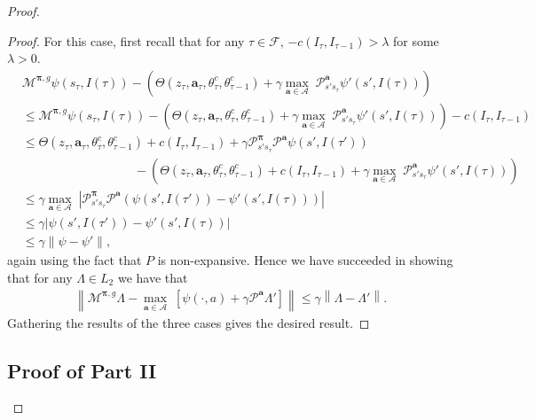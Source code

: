 \documentclass{article}
\begin{document}
\begin{proof}
\begin{proof}
For this case, first recall that for any $\tau\in\mathcal{F}$, $-c(I_\tau,I_{\tau-1})>\lambda$ for some $\lambda >0$.
% 
\begin{align*}
&\mathcal{M}^{\boldsymbol{\pi},g}\psi(s_{\tau},I(\tau))-\left(\Theta(z_\tau,\boldsymbol{a}_\tau,\theta^c_{\tau},\theta^c_{\tau-1})+\gamma\underset{\boldsymbol{a}\in\boldsymbol{\mathcal{A}}}{\max}\;\mathcal{P}^{\boldsymbol{a}}_{s's_\tau}\psi'(s',I(\tau))\right)
\\&\leq \mathcal{M}^{\boldsymbol{\pi},g}\psi(s_{\tau},I(\tau))-\left(\Theta(z_\tau,\boldsymbol{a}_\tau,\theta^c_{\tau},\theta^c_{\tau-1})+\gamma\underset{\boldsymbol{a}\in\boldsymbol{\mathcal{A}}}{\max}\;\mathcal{P}^{\boldsymbol{a}}_{s's_\tau}\psi'(s',I(\tau))\right)-c(I_\tau,I_{\tau-1})
\\&\leq \Theta(z_\tau,\boldsymbol{a}_\tau,\theta^c_{\tau},\theta^c_{\tau-1})+c(I_\tau,I_{\tau-1})+\gamma\mathcal{P}^{\boldsymbol{\pi}}_{s's_\tau}\mathcal{P}^{\boldsymbol{a}}\psi(s',I(\tau'))
\\&\qquad\qquad\qquad\qquad\quad-\left(\Theta(z_\tau,\boldsymbol{a}_\tau,\theta^c_{\tau},\theta^c_{\tau-1})+c(I_\tau,I_{\tau-1})+\gamma\underset{\boldsymbol{a}\in\boldsymbol{\mathcal{A}}}{\max}\;\mathcal{P}^{\boldsymbol{a}}_{s's_\tau}\psi'(s',I(\tau))\right)
\\&\leq \gamma\underset{\boldsymbol{a}\in\boldsymbol{\mathcal{A}}}{\max}\;\left|\mathcal{P}^{\boldsymbol{\pi}}_{s's_\tau}\mathcal{P}^{\boldsymbol{a}}\left(\psi(s',I(\tau'))-\psi'(s',I(\tau))\right)\right|
\\&\leq \gamma\left|\psi(s',I(\tau'))-\psi'(s',I(\tau))\right|
\\&\leq \gamma\left\|\psi-\psi'\right\|,
\end{align*}
again using the fact that $P$ is non-expansive. Hence we have succeeded in showing that for any $\Lambda\in L_2$ we have that
\begin{align}
    \left\|\mathcal{M}^{\boldsymbol{\pi},g}\Lambda-\underset{\boldsymbol{a}\in\boldsymbol{\mathcal{A}}}{\max}\;\left[ \psi(\cdot,a)+\gamma\mathcal{P}^{\boldsymbol{a}}\Lambda'\right]\right\|\leq \gamma\left\|\Lambda-\Lambda'\right\|.\label{off_M_bound_gen}
\end{align}
Gathering the results of the three cases gives the desired result. 
\end{proof}
\subsection*{Proof of Part \textbf{II}}


\end{proof}
\end{document}
